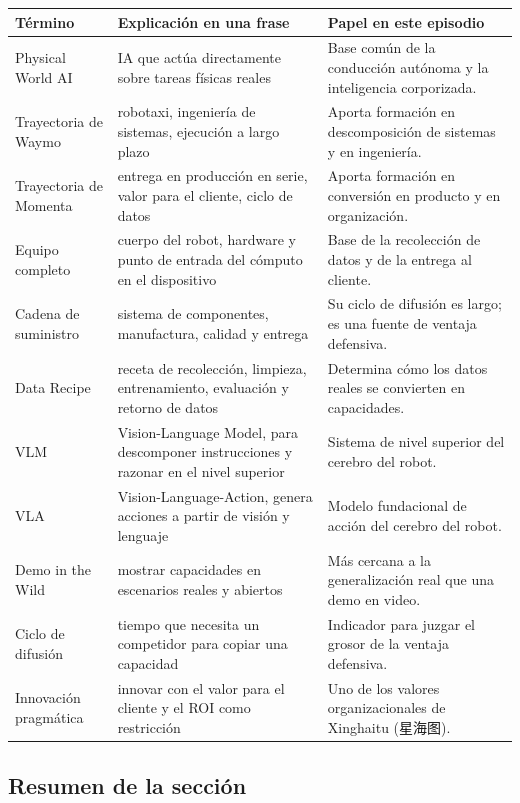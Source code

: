 \documentclass[a4paper]{article}
\begin{document}
\begin{longtable}{p{}p{}p{}}
\toprule
Término & Explicación en una frase & Papel en este episodio \\
\midrule
Physical World AI & IA que actúa directamente sobre tareas físicas reales & Base común de la conducción autónoma y la inteligencia corporizada. \\
Trayectoria de Waymo & robotaxi, ingeniería de sistemas, ejecución a largo plazo & Aporta formación en descomposición de sistemas y en ingeniería. \\
Trayectoria de Momenta & entrega en producción en serie, valor para el cliente, ciclo de datos & Aporta formación en conversión en producto y en organización. \\
Equipo completo & cuerpo del robot, hardware y punto de entrada del cómputo en el dispositivo & Base de la recolección de datos y de la entrega al cliente. \\
Cadena de suministro & sistema de componentes, manufactura, calidad y entrega & Su ciclo de difusión es largo; es una fuente de ventaja defensiva. \\
Data Recipe & receta de recolección, limpieza, entrenamiento, evaluación y retorno de datos & Determina cómo los datos reales se convierten en capacidades. \\
VLM & Vision-Language Model, para descomponer instrucciones y razonar en el nivel superior & Sistema de nivel superior del cerebro del robot. \\
VLA & Vision-Language-Action, genera acciones a partir de visión y lenguaje & Modelo fundacional de acción del cerebro del robot. \\
Demo in the Wild & mostrar capacidades en escenarios reales y abiertos & Más cercana a la generalización real que una demo en video. \\
Ciclo de difusión & tiempo que necesita un competidor para copiar una capacidad & Indicador para juzgar el grosor de la ventaja defensiva. \\
Innovación pragmática & innovar con el valor para el cliente y el ROI como restricción & Uno de los valores organizacionales de Xinghaitu (星海图). \\
\bottomrule
\end{longtable}

\subsection{Resumen de la sección}
\end{document}
